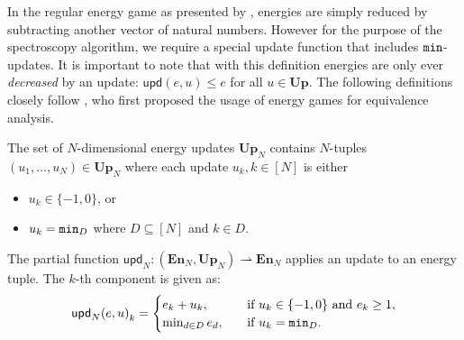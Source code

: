 In the regular energy game as presented by \textcite{brihaye2023multi},
energies are simply reduced by subtracting another vector of natural numbers.
However for the purpose of the spectroscopy algorithm,
we require a special update function that includes $\mathtt{min}$-updates.
It is important to note that with this definition energies are only ever
\emph{decreased} by an update:
$\mathsf{upd}(e, u) \leq e$ for all $u \in \mathbf{Up}$.
The following definitions closely follow \textcite{bisping2023process},
who first proposed the usage of energy games for equivalence analysis.

\begin{definition}\label{def:update}
    The set of $N$-dimensional energy updates $\mathbf{Up}_N$ contains
    $N$-tuples $(u_1, \ldots, u_N) \in \mathbf{Up}_N$ where each update $u_k, k
    \in [N]$ is
    either
    \begin{itemize}
        \item $u_k \in \{-1, 0\}$, or
        \item $u_k = \mathtt{min}_D$ where $D \subseteq [N]$ and $k \in D$.
    \end{itemize}

    The partial function
    $\mathsf{upd}_N: (\mathbf{En}_N, \mathbf{Up}_N) \rightharpoonup \mathbf{En}_N$
    applies an update to an energy tuple.
    The $k$-th component is given as:
    \begin{equation*}
        \mathsf{upd}_N{(e, u)}_k =
        \begin{cases}
            e_k + u_k,\quad &\text{if } u_k \in \{-1, 0\} \text{ and } e_k \geq 1, \\
            \min_{d \in D}{e_d},\quad &\text{if } u_k = \mathtt{min}_D.
        \end{cases}
    \end{equation*}
\end{definition}


